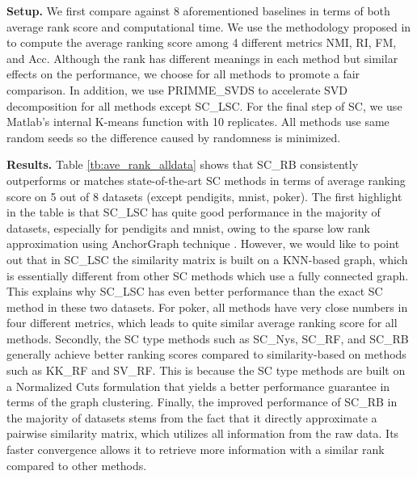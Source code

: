 \documentclass[sigconf]{acmart}
\newcommand{\1}{\boldsymbol{1}}
\newcommand{\0}{\boldsymbol{0}}
\begin{document}
\textbf{Setup.} We first compare against 8 aforementioned baselines in terms of both average rank score and computational time. We use the methodology proposed in \cite{yang2015defining} to compute the average ranking score among 4 different metrics NMI, RI, FM, and Acc. Although the rank  has different meanings in each method but similar effects on the performance, we choose  for all methods to promote a fair comparison. In addition, we use PRIMME\_SVDS to accelerate SVD decomposition for all methods except SC\_LSC. For the final step of SC, we use Matlab's internal K-means function with 10 replicates. All methods use same random seeds so the difference caused by randomness is minimized. 

\textbf{Results.} Table \ref{tb:ave_rank_alldata} shows that SC\_RB consistently outperforms or matches state-of-the-art SC methods in terms of average ranking score on 5 out of 8 datasets (except pendigits, mnist, poker). The first highlight in the table is that SC\_LSC has quite good performance in the majority of datasets, especially for pendigits and mnist, owing to the sparse low rank approximation using AnchorGraph technique \cite{liu2010large}. However, we would like to point out that in SC\_LSC the similarity matrix is built on a KNN-based graph, which is essentially different from other SC methods which use a fully connected graph. This explains why SC\_LSC has even better performance than the exact SC method in these two datasets. For poker, all methods have very close numbers in four different metrics, which leads to quite similar average ranking score for all methods. Secondly, the SC type methods such as SC\_Nys, SC\_RF, and SC\_RB generally achieve better ranking scores compared to similarity-based on methods such as KK\_RF and SV\_RF. This is because the SC type methods are built on a Normalized Cuts formulation that yields a better performance guarantee in terms of the graph clustering. Finally, the improved performance of SC\_RB in the majority of datasets stems from the fact that it directly approximate a pairwise similarity matrix, which utilizes all information from the raw data. Its faster convergence allows it to retrieve more information with a similar rank  compared to other methods. 
\end{document}
